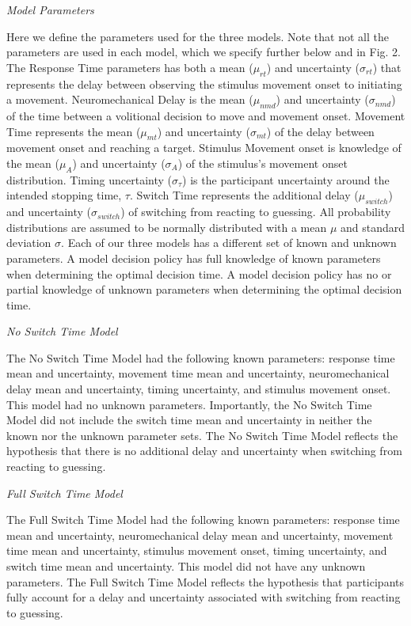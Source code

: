 \documentclass[12pt,letterpaper]{article}
\begin{document}
\noindent \emph{Model Parameters}

\noindent Here we define the parameters used for the three models. Note that not all the parameters are used in each model, which we specify further below and in Fig. 2. The Response Time parameters has both a mean ($\mu_{rt}$) and uncertainty ($\sigma_{rt}$) that represents the delay between observing the stimulus movement onset to initiating a movement. Neuromechanical Delay is the mean ($\mu_{nmd}$) and uncertainty ($\sigma_{nmd}$) of the time between a volitional decision to move and movement onset. Movement Time represents the mean ($\mu_{mt}$) and uncertainty ($\sigma_{mt}$) of the delay between movement onset and reaching a target. Stimulus Movement onset is knowledge of the mean ($\mu_{A}$) and uncertainty ($\sigma_{A}$) of the stimulus’s movement onset distribution. Timing uncertainty ($\sigma_{\tau}$) is the participant uncertainty around the intended stopping time, $\tau$. Switch Time represents the additional delay ($\mu_{switch}$) and uncertainty  ($\sigma_{switch}$) of switching from reacting to guessing. All probability distributions are assumed to be normally distributed with a mean $\mu$ and standard deviation $\sigma$.  Each of our three models has a different set of known and unknown parameters. A model decision policy has full knowledge of known parameters when determining the optimal decision time. A model decision policy has no or partial knowledge of unknown parameters when determining the optimal decision time.

\noindent \emph{No Switch Time Model}

\noindent The No Switch Time Model had the following known parameters: response time mean and uncertainty, movement time mean and uncertainty, neuromechanical delay mean and uncertainty, timing uncertainty, and stimulus movement onset. This model had no unknown parameters. Importantly, the No Switch Time Model did not include the switch time mean and uncertainty in neither the known nor the unknown parameter sets. The No Switch Time Model reflects the hypothesis that there is no additional delay and uncertainty when switching from reacting to guessing.

\noindent \emph{Full Switch Time Model}

\noindent The Full Switch Time Model had the following known parameters: response time mean and uncertainty, neuromechanical delay mean and uncertainty, movement time mean and uncertainty, stimulus movement onset, timing uncertainty, and switch time mean and uncertainty. This model did not have any unknown parameters. The Full Switch Time Model reflects the hypothesis that participants fully account for a delay and uncertainty associated with switching from reacting to guessing.
\end{document}
